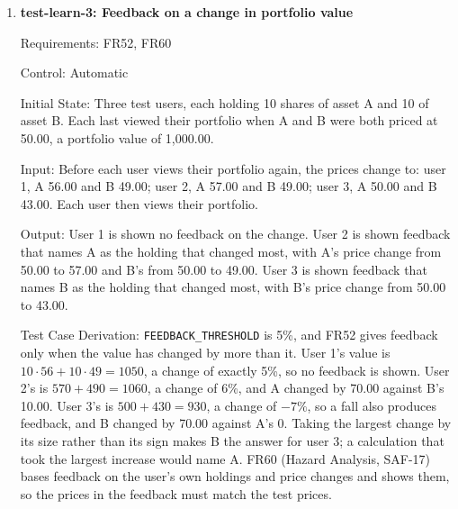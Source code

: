 \documentclass[12pt, titlepage]{article}
\begin{document}
\begin{enumerate}
Test Case Derivation: The fit criterion of FR51 covers every screen on which a
core concept appears. The user holds shares, has a streak and has traded so
that the portfolio, activity and trade feedback screens show their concepts,
such as portfolio value, return and streak. The quantity on the purchase
screen detects an explanation that leaves the screen, since returning to a
new copy of the screen would clear it. The screens come from the app's
navigation, as in test-mkt-20.

How test will be performed: The tester lists the screens in the app's
navigation, records each core concept shown on each one, opens each
explanation, and records any that cannot be opened in place.

\item{\textbf{test-learn-3: Feedback on a change in portfolio value}\\}

Requirements: FR52, FR60

Control: Automatic

Initial State: Three test users, each holding 10 shares of asset A and 10 of
asset B. Each last viewed their portfolio when A and B were both priced at
50.00, a portfolio value of 1,000.00.

Input: Before each user views their portfolio again, the prices change to:
user 1, A 56.00 and B 49.00; user 2, A 57.00 and B 49.00; user 3, A 50.00 and
B 43.00. Each user then views their portfolio.

Output: User 1 is shown no feedback on the change. User 2 is shown feedback
that names A as the holding that changed most, with A's price change from
50.00 to 57.00 and B's from 50.00 to 49.00. User 3 is shown feedback that
names B as the holding that changed most, with B's price change from 50.00 to
43.00.

Test Case Derivation: \texttt{FEEDBACK\_THRESHOLD} is 5\%, and FR52 gives
feedback only when the value has changed by more than it. User 1's value is
$10 \cdot 56 + 10 \cdot 49 = 1050$, a change of exactly 5\%, so no feedback
is shown. User 2's is $570 + 490 = 1060$, a change of 6\%, and A changed by
70.00 against B's 10.00. User 3's is $500 + 430 = 930$, a change of $-7\%$, so
a fall also produces feedback, and B changed by 70.00 against A's 0. Taking
the largest change by its size rather than its sign makes B the answer for
user 3; a calculation that took the largest increase would name A. FR60
(Hazard Analysis, SAF-17) bases feedback on the user's own holdings and price
changes and shows them, so the prices in the feedback must match the test
prices.


\end{enumerate}
\end{document}
